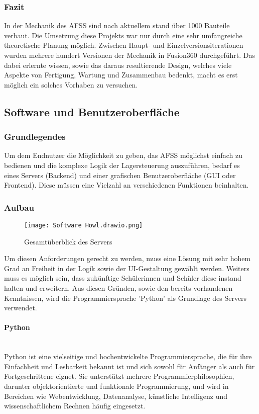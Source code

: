 \subsubsection{Fazit}
In der Mechanik des AFSS sind nach aktuellem stand über 1000 Bauteile verbaut. Die Umsetzung diese Projekts war nur durch eine sehr umfangreiche theoretische Planung möglich. Zwischen Haupt- und Einzelversionsiterationen wurden mehrere hundert Versionen der Mechanik in Fusion360 durchgeführt. Das dabei erlernte wissen, sowie das daraus resultierende Design, welches viele Aspekte von Fertigung, Wartung und Zusammenbau bedenkt, macht es erst möglich ein solches Vorhaben zu versuchen. 



\newpage
\subsection{Software und Benutzeroberfläche}

\subsubsection{Grundlegendes}
Um dem Endnutzer die Möglichkeit zu geben, das AFSS möglichst einfach zu bedienen und die komplexe Logik der Lagersteuerung auszuführen, bedarf es eines Servers (Backend) und einer grafischen Benutzeroberfläche (GUI oder Frontend). Diese müssen eine Vielzahl an verschiedenen Funktionen beinhalten.

\subsubsection{Aufbau}
\begin{figure}[h]
    \texttt{[image: Software Howl.drawio.png]}
    \caption{Gesamtüberblick des Servers}
\end{figure}

Um diesen Anforderungen gerecht zu werden, muss eine Lösung mit sehr hohem Grad an Freiheit in der Logik sowie der UI-Gestaltung gewählt werden. Weiters muss es möglich sein, dass zukünftige Schülerinnen und Schüler diese instand halten und erweitern. Aus diesen Gründen, sowie den bereits vorhandenen Kenntnissen, wird die Programmiersprache 'Python' als Grundlage des Servers verwendet.

\paragraph{Python}\mbox{}\\
Python ist eine vielseitige und hochentwickelte Programmiersprache, die für ihre Einfachheit und Lesbarkeit bekannt ist und sich sowohl für Anfänger als auch für Fortgeschrittene eignet. Sie unterstützt mehrere Programmierphilosophien, darunter objektorientierte und funktionale Programmierung, und wird in Bereichen wie Webentwicklung, Datenanalyse, künstliche Intelligenz und wissenschaftlichem Rechnen häufig eingesetzt. \cite{chatgpt}

